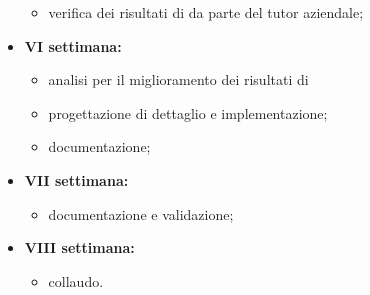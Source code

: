 \begin{itemize}
\begin{itemize}
        \item verifica dei risultati di \emph{\app{}} da parte del tutor aziendale;
    \end{itemize}
    \item \textbf{VI settimana:}
    \begin{itemize}
        \item analisi per il miglioramento dei risultati di \emph{\app{}}
        \item progettazione di dettaglio e implementazione;
        \item documentazione;
    \end{itemize}
    \item \textbf{VII settimana:}
    \begin{itemize}
        \item documentazione e validazione;
    \end{itemize}
    \item \textbf{VIII settimana:}
    \begin{itemize}
        \item collaudo.
    \end{itemize}
\end{itemize}
